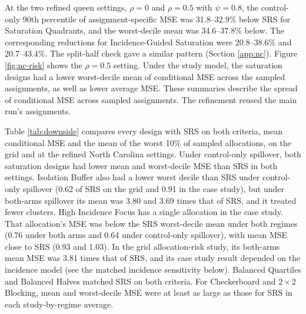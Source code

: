 \documentclass[11pt]{article}
\begin{document}
At the two refined queen settings, $\rho=0$ and $\rho=0.5$ with
$\psi=0.8$, the control-only 90th percentile of assignment-specific MSE
was 31.8--32.9\% below SRS for Saturation Quadrants, and the worst-decile
mean was 34.6--37.8\% below. The corresponding reductions for
Incidence-Guided Saturation were 20.8--38.6\% and 20.7--43.4\%.
The split-half check gave a similar pattern (Section \ref{app:nc}).
\iffullsi Figure \ref{fig:nc-risk} shows the $\rho=0.5$ setting. \fi
Under the study model, the saturation designs had a lower worst-decile
mean of conditional MSE across the sampled assignments, as well as lower
average MSE. These summaries describe the spread of conditional MSE across sampled assignments. The refinement reused the main run's assignments.

Table \ref{tab:downside} compares every design with SRS on both criteria, mean conditional MSE and the mean of the worst 10\% of sampled allocations, on the grid and at the refined North Carolina settings. Under control-only spillover, both saturation designs had lower mean and worst-decile MSE than SRS in both settings. Isolation Buffer also had a lower worst decile than SRS under control-only spillover (0.62 of SRS on the grid and 0.91 in the case study), but under both-arms spillover its mean was 3.80 and 3.69 times that of SRS, and it treated fewer clusters. High Incidence Focus has a single allocation in the case study. That allocation's MSE was below the SRS worst-decile mean under both regimes (0.76 under both arms and 0.64 under control-only spillover), with mean MSE close to SRS (0.93 and 1.03). In the grid allocation-risk study, its both-arms mean MSE was 3.81 times that of SRS, and its case study result depended on the incidence model (see the matched incidence sensitivity below). Balanced Quartiles and Balanced Halves matched SRS on both criteria. For Checkerboard and $2\times2$ Blocking, mean and worst-decile MSE were at least as large as those for SRS in each study-by-regime average.
\end{document}
